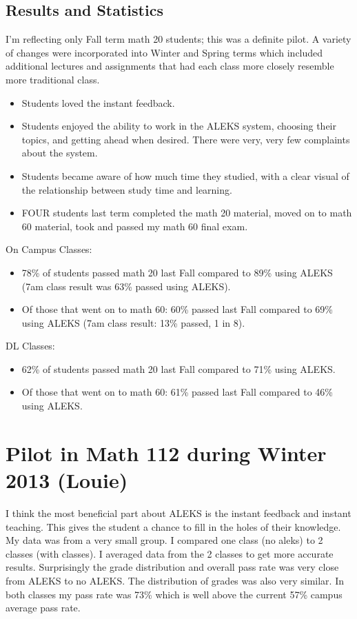 \subsection{Results and Statistics}
I'm reflecting only Fall term math 20 students; this was a definite pilot.  
A variety of changes were incorporated into Winter and Spring terms 
which included additional lectures and assignments that had each class 
more closely resemble more traditional class.
\begin{itemize}
	\item Students loved the instant feedback.
    \item Students enjoyed the ability to work in the ALEKS system, choosing
      their topics, and getting ahead when desired.  There were very, very few
      complaints about the system.
    \item Students became aware of how much time they studied, with a clear
      visual of the relationship between study time and learning. 
    \item FOUR students last term completed the math 20 material, moved on to
      math 60 material, took and passed my math 60 final exam.
\end{itemize}

On Campus Classes:  
\begin{itemize}
    \item 78\% of students passed math 20 last Fall compared to 89\% using
      ALEKS  (7am class result was 63\% passed using ALEKS).
    \item Of those that went on to math 60:  60\% passed last Fall compared to
      69\% using ALEKS (7am class result: 13\% passed, 1 in 8).
\end{itemize}
DL Classes:
\begin{itemize}
    \item 62\% of students passed math 20 last Fall compared to 71\% using
      ALEKS.
    \item Of those that went on to math 60:  61\% passed last Fall compared to
      46\% using ALEKS.  
\end{itemize}

\section{Pilot in Math 112 during Winter 2013 (Louie)}
I think the most beneficial part about ALEKS is the instant feedback and
instant teaching. This gives the student a chance to fill in the holes of their
knowledge. My data was from a very small group. I compared one class (no aleks)
to 2 classes (with classes). I averaged data from the 2 classes to get more
accurate results. Surprisingly the grade distribution and overall pass rate was
very close from ALEKS to no ALEKS. The distribution of grades was also very
similar. In both classes my pass rate was 73\% which is well above the current
57\% campus average pass rate. 

